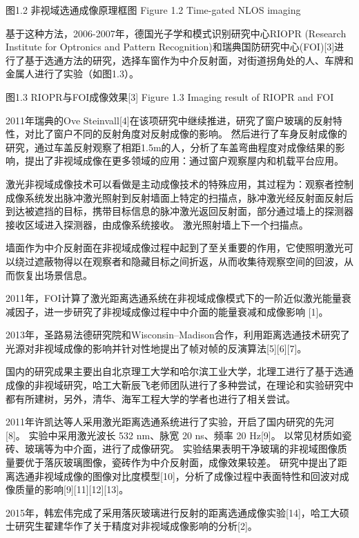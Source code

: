  
图1.2  非视域选通成像原理框图
Figure 1.2 Time-gated NLOS imaging

基于这种方法，2006-2007年，德国光子学和模式识别研究中心RIOPR (Research Institute for Optronics and Pattern Recognition)和瑞典国防研究中心(FOI)[3]进行了基于选通方法的研究，选择车窗作为中介反射面，对街道拐角处的人、车牌和金属人进行了实验（如图1.3）。


 
图1.3  RIOPR与FOI成像效果[3]
Figure 1.3 Imaging result of RIOPR and FOI

2011年瑞典的Ove Steinvall[4]在该项研究中继续推进，研究了窗户玻璃的反射特性，对比了窗户不同的反射角度对反射成像的影响。
然后进行了车身反射成像的研究，通过车盖反射观察了相距1.5m的人，分析了车盖弯曲程度对成像结果的影响，提出了非视域成像在更多领域的应用：通过窗户观察屋内和机载平台应用。

激光非视域成像技术可以看做是主动成像技术的特殊应用，其过程为：观察者控制成像系统发出脉冲激光照射到反射墙面上特定的扫描点，脉冲激光经反射面反射后到达被遮挡的目标，携带目标信息的脉冲激光返回反射面，部分通过墙上的探测器接收区域进入探测器，由成像系统接收。
激光照射墙上下一个扫描点。

墙面作为中介反射面在非视域成像过程中起到了至关重要的作用，它使照明激光可以绕过遮蔽物得以在观察者和隐藏目标之间折返，从而收集待观察空间的回波，从而恢复出场景信息。

2011年，FOI计算了激光距离选通系统在非视域成像模式下的一阶近似激光能量衰减因子，进一步研究了非视域成像过程中中介面的能量衰减和成像影响 [1]。

2013年，圣路易法德研究院和Wisconsin–Madison合作，利用距离选通技术研究了光源对非视域成像的影响并针对性地提出了帧对帧的反演算法[5][6][7]。

国内的研究成果主要出自北京理工大学和哈尔滨工业大学，北理工进行了基于选通成像的非视域研究，哈工大靳辰飞老师团队进行了多种尝试，在理论和实验研究中都有所建树，另外，清华、海军工程大学的学者也进行了相关尝试。

2011年许凯达等人采用激光距离选通系统进行了实验，开启了国内研究的先河[8]。
实验中采用激光波长 532 nm、脉宽 20 ns、频率 20 Hz[9]。
以常见材质如瓷砖、玻璃等为中介面，进行了成像研究。
实验结果表明干净玻璃的非视域图像质量要优于落灰玻璃图像，瓷砖作为中介反射面，成像效果较差。
研究中提出了距离选通非视域成像的图像对比度模型[10]，分析了成像过程中表面特性和回波对成像质量的影响[9][11][12][13]。

2015年，韩宏伟完成了采用落灰玻璃进行反射的距离选通成像实验[14]，哈工大硕士研究生翟建华作了关于精度对非视域成像影响的分析[2]。
 
